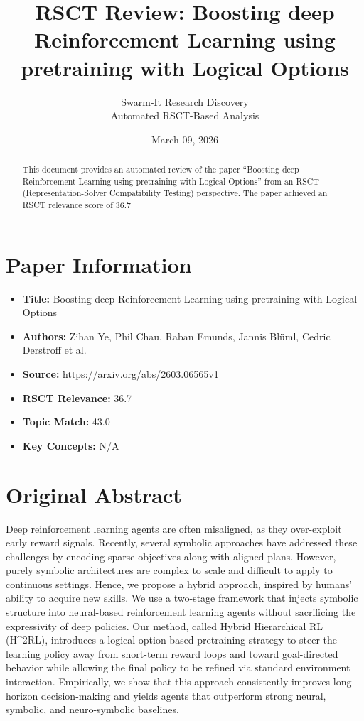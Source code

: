 \documentclass[11pt,a4paper]{article}
\title{RSCT Review: Boosting deep Reinforcement Learning using pretraining with Logical Options}
\author{Swarm-It Research Discovery\\\small Automated RSCT-Based Analysis}
\date{March 09, 2026}
\begin{document}
\maketitle

\begin{abstract}
This document provides an automated review of the paper ``Boosting deep Reinforcement Learning using pretraining with Logical Options'' from an RSCT (Representation-Solver Compatibility Testing) perspective. The paper achieved an RSCT relevance score of 36.7%
\end{abstract}

\section{Paper Information}
\begin{itemize}
\item \textbf{Title:} Boosting deep Reinforcement Learning using pretraining with Logical Options
\item \textbf{Authors:} Zihan Ye, Phil Chau, Raban Emunds, Jannis Blüml, Cedric Derstroff et al.
\item \textbf{Source:} \url{https://arxiv.org/abs/2603.06565v1}
\item \textbf{RSCT Relevance:} 36.7%
\item \textbf{Topic Match:} 43.0%
\item \textbf{Key Concepts:} N/A
\end{itemize}

\section{Original Abstract}
Deep reinforcement learning agents are often misaligned, as they over-exploit early reward signals. Recently, several symbolic approaches have addressed these challenges by encoding sparse objectives along with aligned plans. However, purely symbolic architectures are complex to scale and difficult to apply to continuous settings. Hence, we propose a hybrid approach, inspired by humans' ability to acquire new skills. We use a two-stage framework that injects symbolic structure into neural-based reinforcement learning agents without sacrificing the expressivity of deep policies. Our method, called Hybrid Hierarchical RL (H\textasciicircum{}2RL), introduces a logical option-based pretraining strategy to steer the learning policy away from short-term reward loops and toward goal-directed behavior while allowing the final policy to be refined via standard environment interaction. Empirically, we show that this approach consistently improves long-horizon decision-making and yields agents that outperform strong neural, symbolic, and neuro-symbolic baselines.
\end{document}
